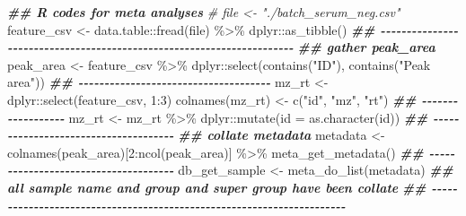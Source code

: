 \documentclass[
]{article}
\newenvironment{Shaded}{\begin{snugshade}}{\end{snugshade}}
\newcommand{\AttributeTok}[1]{\textcolor[rgb]{0.77,0.63,0.00}{#1}}
\newcommand{\CommentTok}[1]{\textcolor[rgb]{0.56,0.35,0.01}{\textit{#1}}}
\newcommand{\DecValTok}[1]{\textcolor[rgb]{0.00,0.00,0.81}{#1}}
\newcommand{\DocumentationTok}[1]{\textcolor[rgb]{0.56,0.35,0.01}{\textbf{\textit{#1}}}}
\newcommand{\FunctionTok}[1]{\textcolor[rgb]{0.00,0.00,0.00}{#1}}
\newcommand{\NormalTok}[1]{#1}
\newcommand{\OtherTok}[1]{\textcolor[rgb]{0.56,0.35,0.01}{#1}}
\newcommand{\SpecialCharTok}[1]{\textcolor[rgb]{0.00,0.00,0.00}{#1}}
\newcommand{\StringTok}[1]{\textcolor[rgb]{0.31,0.60,0.02}{#1}}
\begin{document}
\begin{Shaded}
\begin{Highlighting}[]
\DocumentationTok{\#\# R codes for meta analyses}
\CommentTok{\# file \textless{}{-} "./batch\_serum\_neg.csv"}
\NormalTok{feature\_csv }\OtherTok{\textless{}{-}}\NormalTok{ data.table}\SpecialCharTok{::}\FunctionTok{fread}\NormalTok{(file) }\SpecialCharTok{\%\textgreater{}\%}
\NormalTok{  dplyr}\SpecialCharTok{::}\FunctionTok{as\_tibble}\NormalTok{()}
\DocumentationTok{\#\# {-}{-}{-}{-}{-}{-}{-}{-}{-}{-}{-}{-}{-}{-}{-}{-}{-}{-}{-}{-}{-}{-}{-}{-}{-}{-}{-}{-}{-}{-}{-}{-}{-}{-}{-}{-}{-}{-}{-}{-}{-}{-}{-}{-}{-}{-}{-}{-}{-}{-}{-}{-}{-}{-}{-}{-}{-}{-}{-}{-}{-}{-}{-}{-}{-}{-}{-}{-}{-}{-}  }
\DocumentationTok{\#\# gather peak\_area}
\NormalTok{peak\_area }\OtherTok{\textless{}{-}}\NormalTok{ feature\_csv }\SpecialCharTok{\%\textgreater{}\%}
\NormalTok{  dplyr}\SpecialCharTok{::}\FunctionTok{select}\NormalTok{(}\FunctionTok{contains}\NormalTok{(}\StringTok{"ID"}\NormalTok{), }\FunctionTok{contains}\NormalTok{(}\StringTok{"Peak area"}\NormalTok{))}
\DocumentationTok{\#\# {-}{-}{-}{-}{-}{-}{-}{-}{-}{-}{-}{-}{-}{-}{-}{-}{-}{-}{-}{-}{-}{-}{-}{-}{-}{-}{-}{-}{-}{-}{-}{-}{-}{-}{-}{-}{-} }
\NormalTok{mz\_rt }\OtherTok{\textless{}{-}}\NormalTok{ dplyr}\SpecialCharTok{::}\FunctionTok{select}\NormalTok{(feature\_csv, }\DecValTok{1}\SpecialCharTok{:}\DecValTok{3}\NormalTok{)}
\FunctionTok{colnames}\NormalTok{(mz\_rt) }\OtherTok{\textless{}{-}} \FunctionTok{c}\NormalTok{(}\StringTok{"id"}\NormalTok{, }\StringTok{"mz"}\NormalTok{, }\StringTok{"rt"}\NormalTok{)}
\DocumentationTok{\#\# {-}{-}{-}{-}{-}{-}{-}{-}{-}{-}{-}{-}{-}{-}{-}{-}{-}{-} }
\NormalTok{mz\_rt }\OtherTok{\textless{}{-}}\NormalTok{ mz\_rt }\SpecialCharTok{\%\textgreater{}\%}
\NormalTok{  dplyr}\SpecialCharTok{::}\FunctionTok{mutate}\NormalTok{(}\AttributeTok{id =} \FunctionTok{as.character}\NormalTok{(id))}
\DocumentationTok{\#\# {-}{-}{-}{-}{-}{-}{-}{-}{-}{-}{-}{-}{-}{-}{-}{-}{-}{-}{-}{-}{-}{-}{-}{-}{-}{-}{-}{-}{-}{-}{-}{-}{-}{-}{-}{-}{-} }
\DocumentationTok{\#\# collate metadata}
\NormalTok{metadata }\OtherTok{\textless{}{-}} \FunctionTok{colnames}\NormalTok{(peak\_area)[}\DecValTok{2}\SpecialCharTok{:}\FunctionTok{ncol}\NormalTok{(peak\_area)] }\SpecialCharTok{\%\textgreater{}\%}
  \FunctionTok{meta\_get\_metadata}\NormalTok{()}
\DocumentationTok{\#\# {-}{-}{-}{-}{-}{-}{-}{-}{-}{-}{-}{-}{-}{-}{-}{-}{-}{-}{-}{-}{-}{-}{-}{-}{-}{-}{-}{-}{-}{-}{-}{-}{-}{-}{-}{-}{-} }
\NormalTok{db\_get\_sample }\OtherTok{\textless{}{-}} \FunctionTok{meta\_do\_list}\NormalTok{(metadata)}
\DocumentationTok{\#\# all sample name and group and super group have been collate}
\DocumentationTok{\#\# {-}{-}{-}{-}{-}{-}{-}{-}{-}{-}{-}{-}{-}{-}{-}{-}{-}{-}{-}{-}{-}{-}{-}{-}{-}{-}{-}{-}{-}{-}{-}{-}{-}{-}{-}{-}{-}{-}{-}{-}{-}{-}{-}{-}{-}{-}{-}{-}{-}{-}{-}{-}{-}{-}{-}{-}{-}{-}{-}{-}{-}{-}{-}{-}{-}{-}{-}{-}{-}{-} }

\end{Highlighting}
\end{Shaded}
\end{document}
